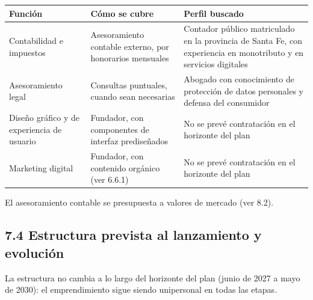 {\def\LTcaptype{none} %
\begin{longtable}[]{@{}
  >{\raggedright\arraybackslash}p{}
  >{\raggedright\arraybackslash}p{}
  >{\raggedright\arraybackslash}p{}@{}}
\toprule\noalign{}
\begin{minipage}[b]{\linewidth}\raggedright
Función
\end{minipage} & \begin{minipage}[b]{\linewidth}\raggedright
Cómo se cubre
\end{minipage} & \begin{minipage}[b]{\linewidth}\raggedright
Perfil buscado
\end{minipage} \\
\midrule\noalign{}
\endhead
\bottomrule\noalign{}
\endlastfoot
Contabilidad e impuestos & Asesoramiento contable externo, por
honorarios mensuales & Contador público matriculado en la provincia de
Santa Fe, con experiencia en monotributo y en servicios digitales \\
Asesoramiento legal & Consultas puntuales, cuando sean necesarias &
Abogado con conocimiento de protección de datos personales y defensa del
consumidor \\
Diseño gráfico y de experiencia de usuario & Fundador, con componentes
de interfaz prediseñados & No se prevé contratación en el horizonte del
plan \\
Marketing digital & Fundador, con contenido orgánico (ver 6.6.1) & No se
prevé contratación en el horizonte del plan \\
\end{longtable}
}

El asesoramiento contable se presupuesta a valores de mercado (ver 8.2).

\subsection*{7.4 Estructura prevista al lanzamiento y
evolución}\label{estructura-prevista-al-lanzamiento-y-evoluciuxf3n}

La estructura no cambia a lo largo del horizonte del plan (junio de 2027
a mayo de 2030): el emprendimiento sigue siendo unipersonal en todas las
etapas.

